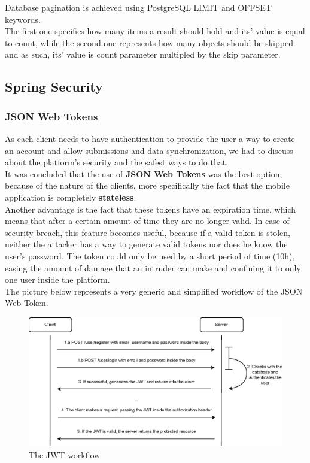 Database pagination is achieved using PostgreSQL LIMIT and OFFSET keywords.\\

The first one specifies how many items a result should hold and its' value is equal to count,
while the second one represents how many objects should be skipped and as such, its' value is count
parameter multipled by the skip parameter.\\

\subsection{Spring Security}

\subsubsection{JSON Web Tokens}

As each client needs to have authentication to provide the user a way to create an account and allow submissions and data synchronization,
we had to discuss about the platform's security and the safest ways to do that.\\

It was concluded that the use of \textbf{JSON Web Tokens}\cite{jwt} was the best option, because of the nature of the clients, more specifically the fact that
the mobile application is completely \textbf{stateless}.\\

Another advantage is the fact that these tokens have an expiration time, which means that after a certain amount of time they are no longer valid.
In case of security breach, this feature becomes useful, because if a valid token is stolen, neither the attacker has a way to generate valid tokens 
nor does he know the user's password. The token could only be used by a short period of time (10h), easing the amount of damage that an intruder can
make and confining it to only one user inside the platform.\\

The picture below represents a very generic and simplified workflow of the JSON Web Token. 

\begin{figure}[H]
    \begin{center}
        \includegraphics[scale=0.9]{_figures/JWT-simple-diagram.eps}
        \caption{The JWT workflow}
    \end{center}
\end{figure}

